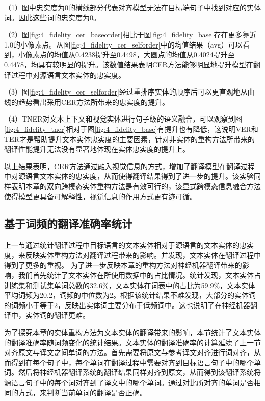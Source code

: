 （1）图中忠实度为0的横线部分代表对齐模型无法在目标端句子中找到对应的实体词。因此这些词的忠实度为0。

（2）图\ref{fig:4_fidelity_cer_baseorder}相比于图\ref{fig:4_fidelity_base}存在更多靠近1.0的小像素点。从图\ref{fig:4_fidelity_cer_selforder}中的均值结果（avg）可以看到，小像素点的均值从0.4238提升至0.4498，大圆点的均值从0.4024提升至0.4478，均具有较明显的提升。该数值结果表明CER方法能够明显地提升模型在翻译过程中对源语言文本实体的忠实度。


（3）图\ref{fig:4_fidelity_cer_selforder}经过重排序实体的顺序后可以更直观地从曲线的趋势看出采用CER方法所带来的忠实度的提升。

（4）TNER对文本上下文和视觉实体进行句子级的语义融合，可以观察到图\ref{fig:4_fidelity_tner}相对于图\ref{fig:4_fidelity_base}有提升也有降低，这说明VER和TER才是帮助提升文本实体忠实度的主要因素，针对非实体的重构方法所带来的翻译性能提升无法没有显著地体现在实体忠实度的提升上。

以上结果表明，CER方法通过融入视觉信息的方式，增加了翻译模型在翻译过程中对源语言文本实体的忠实度，从而使得翻译结果得到了进一步的提升。该实验同样表明本章的双向跨模态实体重构方法是有效可行的，该显式跨模态信息融合方法使得模型更具备可解释性，视觉信息的作用方式更有迹可循。

\subsection{基于词频的翻译准确率统计}
\label{sec:4_freq_acc}


上一节通过统计翻译过程中目标语言的文本实体相对于源语言的文本实体的忠实度，来反映实体重构方法对翻译过程带来的影响。并发现，文本实体在翻译过程中得到了更多的重视。
为了进一步反映本章的重构方法对神经机器翻译带来的影响，我们首先统计了文本实体在所使用数据中的占比情况。统计发现，文本实体占训练集和测试集单词总数的32.6\%，文本实体在词表中的占比为59.9\%，文本实体平均词频为20.2，词频的中位数为2。根据该统计结果不难发现，大部分的实体词的词频小于等于2，反映出实体词主要分布于低频词中。这也说明了在神经机器翻译中，实体词的翻译更难。

为了探究本章的实体重构方法为文本实体的翻译带来的影响，本节统计了文本实体的翻译准确率随词频变化的统计结果。文本实体的翻译准确率的计算延续了上一节对齐原文与译文之间单词的方法。首先需要将原文与参考译文对齐进行词对齐，从而得到在每个句子中，每个单词在翻译过程中需要对齐到目标语言句子中的哪个单词。然后将神经机器翻译系统的翻译结果同样对齐到原文，从而得到该翻译系统将源语言句子中的每个词对齐到了译文中的哪个单词。通过对比所对齐的单词是否相同的方式，来判断当前单词的翻译是否正确。


